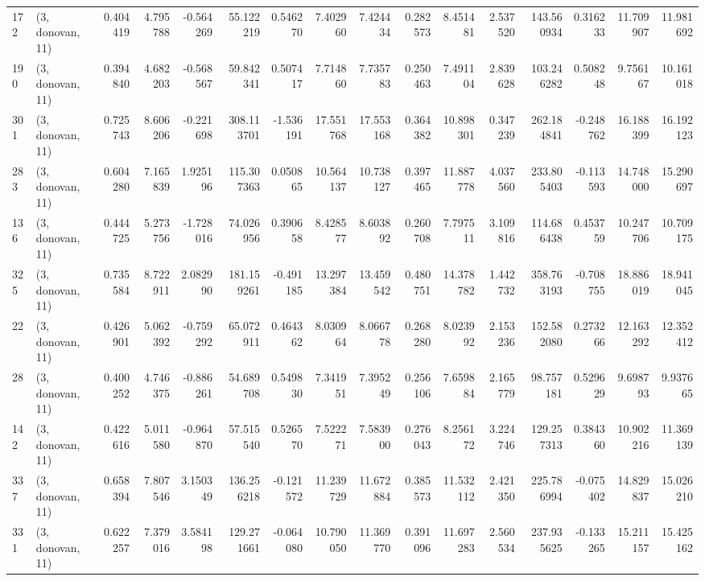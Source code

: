 \begin{tabular}{llrrrrrrrrrrrrrr}
172 &  (3, donovan, 11) &   0.404419 &   4.795788 &  -0.564269 &    55.122219 &   0.546270 &   7.402960 &   7.424434 &  0.282573 &   8.451481 &   2.537520 &    143.560934 &    0.316233 &   11.709907 &   11.981692 \\
190 &  (3, donovan, 11) &   0.394840 &   4.682203 &  -0.568567 &    59.842341 &   0.507417 &   7.714860 &   7.735783 &  0.250463 &   7.491104 &   2.839628 &    103.246282 &    0.508248 &    9.756167 &   10.161018 \\
301 &  (3, donovan, 11) &   0.725743 &   8.606206 &  -0.221698 &   308.113701 &  -1.536191 &  17.551768 &  17.553168 &  0.364382 &  10.898301 &   0.347239 &    262.184841 &   -0.248762 &   16.188399 &   16.192123 \\
283 &  (3, donovan, 11) &   0.604280 &   7.165839 &   1.925196 &   115.307363 &   0.050865 &  10.564137 &  10.738127 &  0.397465 &  11.887778 &   4.037560 &    233.805403 &   -0.113593 &   14.748000 &   15.290697 \\
136 &  (3, donovan, 11) &   0.444725 &   5.273756 &  -1.728016 &    74.026956 &   0.390658 &   8.428577 &   8.603892 &  0.260708 &   7.797511 &   3.109816 &    114.686438 &    0.453759 &   10.247706 &   10.709175 \\
325 &  (3, donovan, 11) &   0.735584 &   8.722911 &   2.082990 &   181.159261 &  -0.491185 &  13.297384 &  13.459542 &  0.480751 &  14.378782 &   1.442732 &    358.763193 &   -0.708755 &   18.886019 &   18.941045 \\
22  &  (3, donovan, 11) &   0.426901 &   5.062392 &  -0.759292 &    65.072911 &   0.464362 &   8.030964 &   8.066778 &  0.268280 &   8.023992 &   2.153236 &    152.582080 &    0.273266 &   12.163292 &   12.352412 \\
28  &  (3, donovan, 11) &   0.400252 &   4.746375 &  -0.886261 &    54.689708 &   0.549830 &   7.341951 &   7.395249 &  0.256106 &   7.659884 &   2.165779 &     98.757181 &    0.529629 &    9.698793 &    9.937665 \\
142 &  (3, donovan, 11) &   0.422616 &   5.011580 &  -0.964870 &    57.515540 &   0.526570 &   7.522271 &   7.583900 &  0.276043 &   8.256172 &   3.224746 &    129.257313 &    0.384360 &   10.902216 &   11.369139 \\
337 &  (3, donovan, 11) &   0.658394 &   7.807546 &   3.150349 &   136.256218 &  -0.121572 &  11.239729 &  11.672884 &  0.385573 &  11.532112 &   2.421350 &    225.786994 &   -0.075402 &   14.829837 &   15.026210 \\
331 &  (3, donovan, 11) &   0.622257 &   7.379016 &   3.584198 &   129.271661 &  -0.064080 &  10.790050 &  11.369770 &  0.391096 &  11.697283 &   2.560534 &    237.935625 &   -0.133265 &   15.211157 &   15.425162 \\

\end{tabular}
